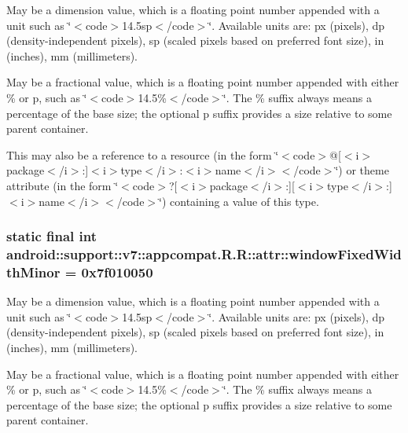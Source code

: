 May be a dimension value, which is a floating point number appended with a unit such as \char`\"{}$<$code$>$14.5sp$<$/code$>$\char`\"{}. Available units are: px (pixels), dp (density-independent pixels), sp (scaled pixels based on preferred font size), in (inches), mm (millimeters). 

May be a fractional value, which is a floating point number appended with either \% or p, such as \char`\"{}$<$code$>$14.5\%$<$/code$>$\char`\"{}. The \% suffix always means a percentage of the base size; the optional p suffix provides a size relative to some parent container. 

This may also be a reference to a resource (in the form \char`\"{}$<$code$>$@\mbox{[}$<$i$>$package$<$/i$>$:\mbox{]}$<$i$>$type$<$/i$>$:$<$i$>$name$<$/i$>$$<$/code$>$\char`\"{}) or theme attribute (in the form \char`\"{}$<$code$>$?\mbox{[}$<$i$>$package$<$/i$>$:\mbox{]}\mbox{[}$<$i$>$type$<$/i$>$:\mbox{]}$<$i$>$name$<$/i$>$$<$/code$>$\char`\"{}) containing a value of this type. \hypertarget{classandroid_1_1support_1_1v7_1_1appcompat_1_1_r_1_1attr_3e6187b6b920a88b888b39cb2101d409}{
\subsubsection[{windowFixedWidthMinor}]{\setlength{\rightskip}{0pt plus 5cm}static final int android::support::v7::appcompat.R.R::attr::windowFixedWidthMinor = 0x7f010050}}
\label{classandroid_1_1support_1_1v7_1_1appcompat_1_1_r_1_1attr_3e6187b6b920a88b888b39cb2101d409}


May be a dimension value, which is a floating point number appended with a unit such as \char`\"{}$<$code$>$14.5sp$<$/code$>$\char`\"{}. Available units are: px (pixels), dp (density-independent pixels), sp (scaled pixels based on preferred font size), in (inches), mm (millimeters). 

May be a fractional value, which is a floating point number appended with either \% or p, such as \char`\"{}$<$code$>$14.5\%$<$/code$>$\char`\"{}. The \% suffix always means a percentage of the base size; the optional p suffix provides a size relative to some parent container. 

